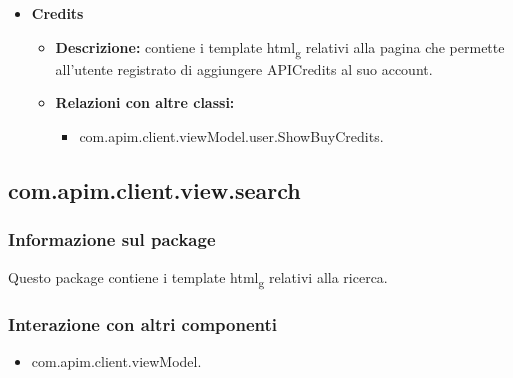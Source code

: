 {{{\begin{itemize}
\begin{itemize}
						\item \textbf{Relazioni con altre classi:}
						\begin{itemize}
							\item com.apim.client.viewModel.user.ShowNewApi.
						\end{itemize}
					\end{itemize}
				\item \textbf{Credits}
				\begin{itemize}
					\item \textbf{Descrizione:} contiene i template html\textsubscript{g} relativi alla pagina che permette all'utente registrato di aggiungere APICredits al suo account.
					\item \textbf{Relazioni con altre classi:}
					\begin{itemize}
						\item com.apim.client.viewModel.user.ShowBuyCredits.
					\end{itemize}
				\end{itemize}
			\end{itemize}
		}
	}
	\subsection{com.apim.client.view.search}{
		\subsubsection{Informazione sul package}{
			Questo package contiene i template html\textsubscript{g} relativi alla ricerca.
		}
		\subsubsection{Interazione con altri componenti}{
			\begin{itemize}
				\item com.apim.client.viewModel.
			\end{itemize}
		}
}}
